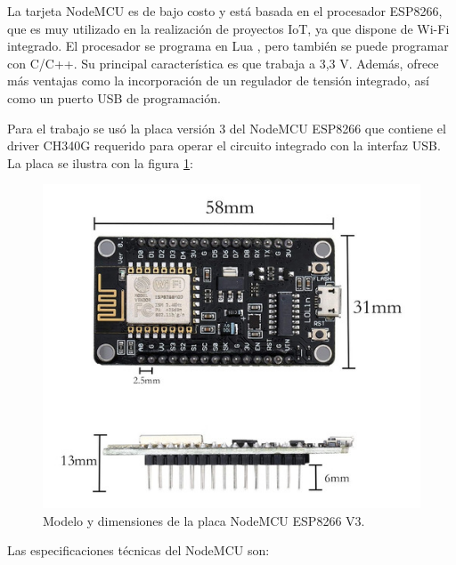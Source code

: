 La tarjeta NodeMCU es de bajo costo y está basada en el procesador ESP8266, que es muy utilizado en la realización de proyectos IoT, ya que dispone de Wi-Fi integrado. El procesador se programa en Lua \citep{WEBSITE:38}, pero también se puede programar con C/C++. Su principal característica es que trabaja a 3,3 V.  Además, ofrece más ventajas como la incorporación de un regulador de tensión integrado, así como un puerto USB de programación. 

 
Para el trabajo se usó la placa versión 3 del NodeMCU ESP8266 que contiene el driver CH340G requerido para operar el circuito integrado con la interfaz USB. La placa se ilustra con la figura \ref{fig:nodemcu}:

\begin{figure}[htbp]
	\centering
	\includegraphics[width=.8\textwidth]{./Figures/nodemcuV3.jpg}
	\caption{Modelo y dimensiones de la placa NodeMCU ESP8266 V3.}

	\label{fig:nodemcu}
\end{figure}

Las especificaciones técnicas del NodeMCU son:

